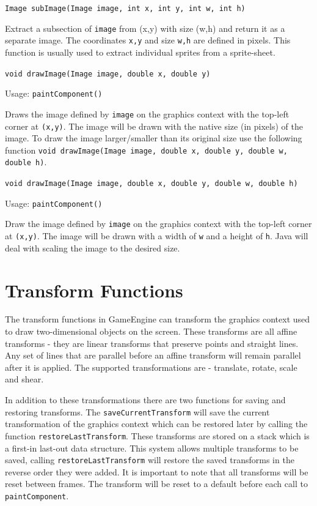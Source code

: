 \documentclass[a4paper, 10pt]{report}
\begin{document}
{\large {\tt Image subImage(Image image, int x, int y, int w, int h)}}

Extract a subsection of {\tt image} from (x,y) with size (w,h) and return it as a separate image. The coordinates {\tt x,y} and size {\tt w,h} are defined in pixels. This function is usually used to extract individual sprites from a sprite-sheet.

\hrulefill

{\large {\tt void drawImage(Image image, double x, double y)}}

Usage: {\tt paintComponent()}

Draws the image defined by {\tt image} on the graphics context with the top-left corner at {\tt (x,y)}. The image will be drawn with the native size (in pixels) of the image. To draw the image larger/smaller than its original size use the following function {\tt void drawImage(Image image, double x, double y, double w, double h)}.

\hrulefill

{\large {\tt void drawImage(Image image, double x, double y, double w, double h)}}

Usage: {\tt paintComponent()}

Draw the image defined by {\tt image} on the graphics context with the top-left corner at {\tt (x,y)}. The image will be drawn with a width of {\tt w} and a height of {\tt h}. Java will deal with scaling the image to the desired size.

\section{Transform Functions}

The transform functions in GameEngine can transform the graphics context used to draw two-dimensional objects on the screen. These transforms are all affine transforms - they are linear transforms that preserve points and straight lines. Any set of lines that are parallel before an affine transform will remain parallel after it is applied. The supported transformations are - translate, rotate, scale and shear.

In addition to these transformations there are two functions for saving and restoring transforms. The {\tt saveCurrentTransform} will save the current transformation of the graphics context which can be restored later by calling the function {\tt restoreLastTransform}. These transforms are stored on a stack which is a first-in last-out data structure. This system allows multiple transforms to be saved, calling {\tt restoreLastTransform} will restore the saved transforms in the reverse order they were added. It is important to note that all transforms will be reset between frames. The transform will be reset to a default before each call to {\tt paintComponent}.
\end{document}
